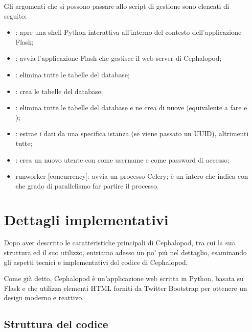             Gli argomenti che si possono passare allo script di gestione sono elencati di seguito:
            
            \begin{itemize}
                \item {}: apre una shell Python interattiva all'interno del contesto dell'applicazione Flask;
                \item {}: avvia l'applicazione Flash che gestisce il web server di Cephalopod;
                \item {}: elimina tutte le tabelle del database;
                \item {}: crea le tabelle del database;
                \item {}: elimina tutte le tabelle del database e ne crea di nuove (equivalente a fare  e );
                \item {}: estrae i dati da una specifica istanza (se viene passato un \ac{UUID}), altrimenti tutte;
                \item {}: crea un nuovo utente con  come username e  come password di accesso;
                \item runworker [concurrency]: avvia un processo Celery;  è un intero che indica con che grado di parallelismo far partire il processo.
            \end{itemize}
    
    \section{Dettagli implementativi} \label{sec:it;dettagli_implementativi}
    
        Dopo aver descritto le caratteristiche principali di Cephalopod, tra cui la sua struttura ed il suo utilizzo, entriamo adesso un po' più nel dettaglio, esaminando gli aspetti tecnici e implementativi del codice di Cephalopod.
        
        Come già detto, Cephalopod è un'applicazione web scritta in Python, basata su Flask e che utilizza elementi \ac{HTML} forniti da Twitter Bootstrap per ottenere un design moderno e reattivo.
        
        \subsection{Struttura del codice} \label{subsec:it;di;struttura_codice}
        
